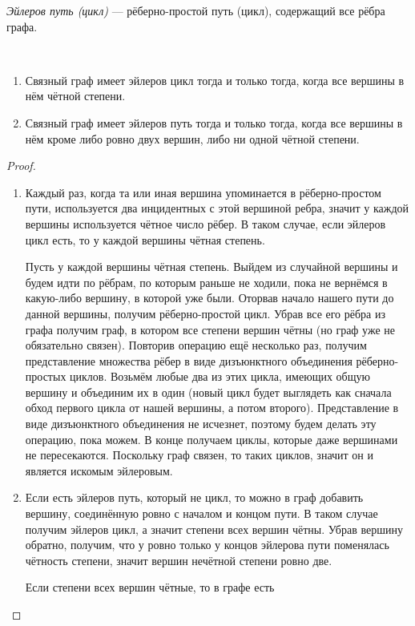 \documentclass[12pt,a4paper]{article}
\begin{document}
    \begin{definition}
        \emph{Эйлеров путь (цикл)} --- рёберно-простой путь (цикл), содержащий все рёбра графа.
    \end{definition}

    \begin{theorem}[Эйлера]\ 
        \begin{enumerate}
            \item Связный граф имеет эйлеров цикл тогда и только тогда, когда все вершины в нём чётной степени.
            \item Связный граф имеет эйлеров путь тогда и только тогда, когда все вершины в нём кроме либо ровно двух вершин, либо ни одной чётной степени.
        \end{enumerate}
    \end{theorem}
    
    \begin{proof}
        \begin{enumerate}
            \item
                Каждый раз, когда та или иная вершина упоминается в рёберно-простом пути, используется два инцидентных с этой вершиной ребра, значит у каждой вершины используется чётное число рёбер. В таком случае, если эйлеров цикл есть, то у каждой вершины чётная степень.
    
                Пусть у каждой вершины чётная степень. Выйдем из случайной вершины и будем идти по рёбрам, по которым раньше не ходили, пока не вернёмся в какую-либо вершину, в которой уже были. Оторвав начало нашего пути до данной вершины, получим рёберно-простой цикл. Убрав все его рёбра из графа получим граф, в котором все степени вершин чётны (но граф уже не обязательно связен). Повторив операцию ещё несколько раз, получим представление множества рёбер в виде дизъюнктного объединения рёберно-простых циклов. Возьмём любые два из этих цикла, имеющих общую вершину и объединим их в один (новый цикл будет выглядеть как сначала обход первого цикла от нашей вершины, а потом второго). Представление в виде дизъюнктного объединения не исчезнет, поэтому будем делать эту операцию, пока можем. В конце получаем циклы, которые даже вершинами не пересекаются. Поскольку граф связен, то таких циклов, значит он и является искомым эйлеровым.
            \item
                Если есть эйлеров путь, который не цикл, то можно в граф добавить вершину, соединённую ровно с началом и концом пути. В таком случае получим эйлеров цикл, а значит степени всех вершин чётны. Убрав вершину обратно, получим, что у ровно только у концов эйлерова пути поменялась чётность степени, значит вершин нечётной степени ровно две.

                Если степени всех вершин чётные, то в графе есть 
        \end{enumerate}
    \end{proof}
\end{document}
